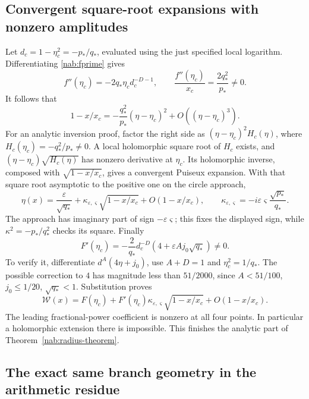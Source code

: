 \subsection{Convergent square-root expansions with nonzero amplitudes}

Let $d_c=1-\eta_c^2=-p_*/q_*$, evaluated using the just specified
local logarithm. Differentiating \eqref{nab:fprime} gives
\[
 f''(\eta_c)=-2q_*\eta_c d_c^{-D-1},\qquad
 \frac{f''(\eta_c)}{x_c}=\frac{2q_*^2}{p_*}\ne0.
\]
It follows that
\[
 1-x/x_c=-\frac{q_*^2}{p_*}(\eta-\eta_c)^2
                   +O((\eta-\eta_c)^3).
\]
For an analytic inversion proof, factor the right side as
$(\eta-\eta_c)^2H_c(\eta)$, where
$H_c(\eta_c)=-q_*^2/p_*\ne0$. A local holomorphic square root of
$H_c$ exists, and $(\eta-\eta_c)\sqrt{H_c(\eta)}$ has nonzero
derivative at $\eta_c$. Its holomorphic inverse, composed with
$\sqrt{1-x/x_c}$, gives a convergent Puiseux expansion. With that
square root asymptotic to the positive one on the circle approach,
\begin{equation}\label{nab:puiseux-inverse}
 \eta(x)=\frac{\varepsilon}{\sqrt{q_*}}
   +\kappa_{\varepsilon,\varsigma}\sqrt{1-x/x_c}
   +O(1-x/x_c),\qquad
 \kappa_{\varepsilon,\varsigma}
       =-i\varepsilon\varsigma\frac{\sqrt{p_*}}{q_*}.
\end{equation}
The approach has imaginary part of sign $-\varepsilon\varsigma$;
this fixes the displayed sign, while $\kappa^2=-p_*/q_*^2$ checks
its square. Finally
\begin{equation}\label{nab:no-cancellation}
 F'(\eta_c)=-\frac2{q_*}d_c^{-D}
                   (4+\varepsilon A j_0\sqrt{q_*})\ne0.
\end{equation}
To verify it, differentiate $d^A(4\eta+j_0)$, use $A+D=1$ and
$\eta_c^2=1/q_*$. The possible correction to $4$ has magnitude
less than $51/2000$, since $A<51/100$, $j_0\leq1/20$,
$\sqrt{q_*}<1$. Substitution proves
\begin{equation}\label{nab:puiseux-W}
 \mathcal W(x)=F(\eta_c)
       +F'(\eta_c)\kappa_{\varepsilon,\varsigma}
                           \sqrt{1-x/x_c}+O(1-x/x_c).
\end{equation}
The leading fractional-power coefficient is nonzero at all four
points. In particular a holomorphic extension there is impossible.
This finishes the analytic part of Theorem~\ref{nab:radius-theorem}.

\subsection{The exact same branch geometry in the arithmetic residue}

